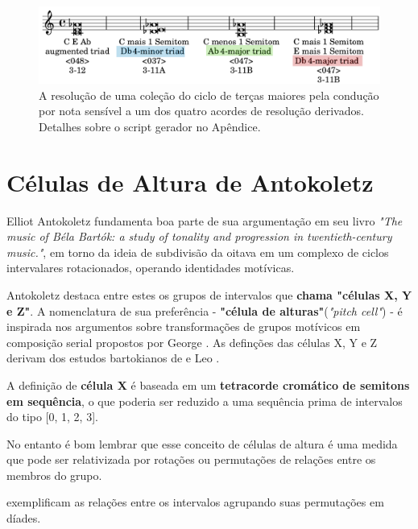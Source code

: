 \documentclass[
	12pt,				%
	openright,			%
	twoside,			%
	a4paper,			%
	english,			%
	french,				%
	spanish,			%
	brazil				%
	]{abntex2}
\begin{document}
\begin{figure}[!h]
	\caption{\label{fig_grafico}A resolução de uma coleção do ciclo de terças maiores pela condução por nota sensível a um dos quatro acordes de resolução derivados. Detalhes sobre o script gerador no Apêndice.   }
	\begin{center}
	    \includegraphics[scale=0.3]{ciclos/transpoe_triades_aumentadas.png}
	\end{center}
\end{figure}
\pagebreak



\section{Células de Altura de Antokoletz}
\label{celZ}

Elliot Antokoletz fundamenta boa parte de sua argumentação em seu livro \textit{"The music of Béla Bartók: a study of tonality and progression in twentieth-century music."}\cite{antokoletz1984music}, em torno da ideia de subdivisão da oitava em um complexo de ciclos intervalares rotacionados, operando identidades motívicas. 

Antokoletz destaca entre estes os grupos de intervalos que \textbf{chama "células X, Y e Z"}\cite[p. 69-77]{antokoletz1984music}. A nomenclatura de sua preferência - \textbf{"célula de alturas"}(\textit{"pitch cell"}) - é inspirada nos argumentos sobre transformações de grupos motívicos em composição serial propostos por George . As definções das células X, Y e Z derivam dos estudos bartokianos de  e Leo .

A definição de \textbf{célula X} é baseada em um \textbf{tetracorde cromático de semitons em sequência}, o que poderia ser reduzido a uma sequência prima de intervalos do tipo [0, 1, 2, 3]. 

No entanto é bom lembrar que esse conceito de células de altura é uma medida que pode ser relativizada por rotações ou permutações de relações entre os membros do grupo.

 exemplificam as relações entre os intervalos agrupando suas permutações em díades.
\end{document}
